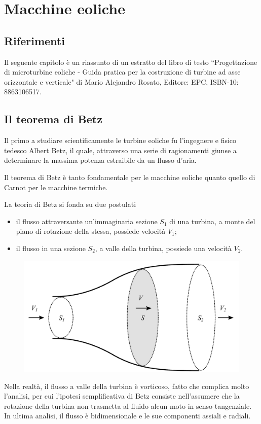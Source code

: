 \chapter{Macchine eoliche}
\section{Riferimenti}
Il seguente capitolo è un riassunto di un estratto del libro di testo ``Progettazione di microturbine eoliche - Guida pratica per la costruzione di turbine ad asse orizzontale e verticale" di Mario Alejandro Rosato, Editore: EPC, ISBN-10: 8863106517.
\section{Il teorema di Betz}
Il primo a studiare scientificamente le turbine eoliche fu l'ingegnere e fisico tedesco Albert Betz, il quale, attraverso una serie di ragionamenti giunse a determinare la massima potenza estraibile da un flusso d'aria.

Il teorema di Betz è tanto fondamentale per le macchine eoliche quanto quello di Carnot per le macchine termiche. 

La teoria di Betz si fonda su due postulati
\begin{itemize}
\item il flusso attraversante un'immaginaria sezione $S_1$ di una turbina, a monte del piano di rotazione della stessa, possiede velocità $V_1$;
\item il flusso in una sezione $S_2$, a valle della turbina, possiede una velocità $V_2$.
\end{itemize}
\begin{figure}
\centering
  \includegraphics[width=.6\textwidth]{fig/Betz.pdf}
\caption{}
\label{}
\end{figure}
Nella realtà, il flusso a valle della turbina è vorticoso, fatto che complica molto l'analisi, per cui l'ipotesi semplificativa di Betz consiste nell'assumere che la rotazione della turbina non trasmetta al fluido alcun moto in senso tangenziale. In ultima analisi, il flusso è bidimensionale e le sue componenti assiali e radiali. 

